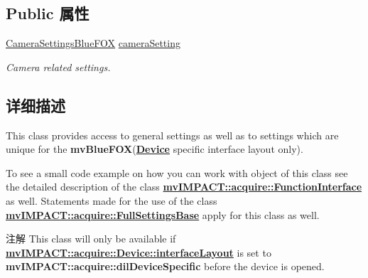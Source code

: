 \subsection*{Public 属性}
\begin{DoxyCompactItemize}
\item 
\hypertarget{classmv_i_m_p_a_c_t_1_1acquire_1_1_settings_blue_f_o_x_ae84f8c37e9934ad992ff3241d0550329}{\hyperlink{classmv_i_m_p_a_c_t_1_1acquire_1_1_camera_settings_blue_f_o_x}{Camera\+Settings\+Blue\+F\+O\+X} \hyperlink{classmv_i_m_p_a_c_t_1_1acquire_1_1_settings_blue_f_o_x_ae84f8c37e9934ad992ff3241d0550329}{camera\+Setting}}\label{classmv_i_m_p_a_c_t_1_1acquire_1_1_settings_blue_f_o_x_ae84f8c37e9934ad992ff3241d0550329}

\begin{DoxyCompactList}\small\item\em Camera related settings. \end{DoxyCompactList}\end{DoxyCompactItemize}


\subsection{详细描述}
This class provides access to general settings as well as to settings which are unique for the {\bfseries mv\+Blue\+F\+O\+X}({\bfseries \hyperlink{classmv_i_m_p_a_c_t_1_1acquire_1_1_device}{Device}} specific interface layout only). 

To see a small code example on how you can work with object of this class see the detailed description of the class {\bfseries \hyperlink{classmv_i_m_p_a_c_t_1_1acquire_1_1_function_interface}{mv\+I\+M\+P\+A\+C\+T\+::acquire\+::\+Function\+Interface}} as well. Statements made for the use of the class {\bfseries \hyperlink{classmv_i_m_p_a_c_t_1_1acquire_1_1_full_settings_base}{mv\+I\+M\+P\+A\+C\+T\+::acquire\+::\+Full\+Settings\+Base}} apply for this class as well.

\begin{DoxyNote}{注解}
This class will only be available if {\bfseries \hyperlink{classmv_i_m_p_a_c_t_1_1acquire_1_1_device_ab4dd0ecc9d456bb5ddc01d844c9d6f2d}{mv\+I\+M\+P\+A\+C\+T\+::acquire\+::\+Device\+::interface\+Layout}} is set to {\bfseries mv\+I\+M\+P\+A\+C\+T\+::acquire\+::dil\+Device\+Specific} before the device is opened. 
\end{DoxyNote}


